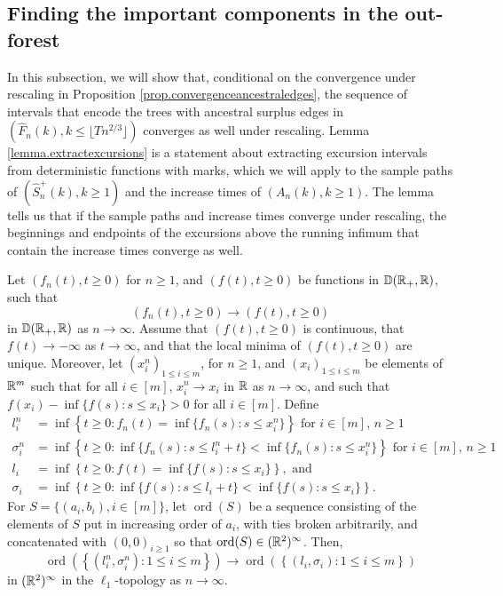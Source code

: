 \subsection{Finding the important components in the out-forest}\label{subsec.componentswithancestral}
In this subsection, we will show that, conditional on the convergence under rescaling in Proposition \ref{prop.convergenceancestraledges}, the sequence of intervals that encode the trees with ancestral surplus edges in $(\hat{F}_n(k),k\leq \lfloor T n^{2/3}\rfloor )$ converges as well under rescaling. Lemma \ref{lemma.extractexcursions} is a statement about extracting excursion intervals from deterministic functions with marks, which we will apply to the sample paths of $(\hat{S}_n^{+}(k),k\geq 1)$ and the increase times of $(A_n(k),k\geq 1)$. The lemma tells us that if the sample paths and increase times converge under rescaling, the beginnings and endpoints of the excursions above the running infimum that contain the increase times converge as well. 
\begin{lemma}\label{lemma.extractexcursions}
Let $(f_n(t), t\geq 0)$ for $n\geq 1$, and $(f(t),t\geq 0)$ be functions in ${\mathbb D}({\mathbb R}_+,{\mathbb R})$, such that 
$$(f_n(t), t\geq 0)\to (f(t),t\geq 0)$$ in ${\mathbb D}({\mathbb R}_+,{\mathbb R})$ as $n\to \infty$. Assume that $(f(t),t\geq 0)$ is continuous, that $f(t)\to -\infty$ as $t\to \infty$, and that the local minima of $(f(t),t\geq 0)$ are unique. Moreover, let $(x_i^n)_{1\leq i\leq m}$, for $n\geq 1$, and $(x_i)_{1\leq i\leq m}$ be elements of ${\mathbb R}^{m}$ such that for all $i\in [m]$, $x_i^n\to x_i$ in ${\mathbb R}$ as $n\to \infty$, and such that $f(x_i)-\inf\{f(s):s\leq x_i\}>0$ for all $i\in [m]$. Define
\begin{align*}l_i^n&=\inf\left\{t\geq 0:f_n(t)=\inf\{f_n(s):s\leq x_i^n\}\right\}\text{ for }i\in [m]\text{, }n\geq 1\\
\sigma_i^n&=\inf\left\{ t\geq 0: \inf\{f_n(s):s\leq l_i^n+t\} < \inf\{f_n(s):s\leq x_i^n\}\right\}\text{ for }i\in [m]\text{, }n\geq 1\\
l_i&=\inf\left\{t\geq 0:f(t)=\inf\{f(s):s\leq x_i\}\right\},\text{ and}\\
\sigma_i&=\inf\left\{ t\geq 0: \inf\{f(s):s\leq l_i+ t\} < \inf\{f(s):s\leq x_i\}\right\}.
\end{align*}
For $S=\{(a_i,b_i), i\in [m]\}$, let $\operatorname{ord}(S)$ be a sequence consisting of the elements of $S$ put in increasing order of $a_i$, with ties broken arbitrarily, and concatenated with $(0,0)_{i\geq 1}$ so that $\operatorname{ord}(S)\in ({\mathbb R}^2)^\infty$. Then, 
$$\operatorname{ord}\left(\left\{(l_i^n,\sigma_i^n):1\leq i \leq m\right\}\right)\to \operatorname{ord}\left(\left\{(l_i,\sigma_i):1\leq i \leq m\right\}\right)$$
in $({\mathbb R}^{2})^\infty$ in the $\ell_1$-topology as $n\to \infty$. 
\end{lemma}
